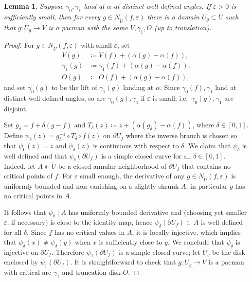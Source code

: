 \documentclass[]{amsart}
\newtheorem{lem}[thm]{Lemma}
\theoremstyle{remark}
\numberwithin{equation}{section}
\theoremstyle{definition}
\begin{document}
\begin{lem}
\label{lmm:PacmN}
Suppose $\gamma_0,\gamma_1$ land at $\alpha$ at distinct well-defined  angles. If $\varepsilon>0$ is sufficiently small, then for every $g\in N_{\widetilde U}(f, \varepsilon)$ there is a domain $U_g\subset \widetilde U$ such that $g:U_g \to V$ is a pacman with the same $V, \gamma_1 , O$ (up to translation). 
\end{lem}
\begin{proof}
For $g\in N_{\widetilde U}(f, \varepsilon)$ with small $\varepsilon$, set \[
\begin{array}{cc}
V(g)&\coloneqq V(f)+(\alpha(g)-\alpha(f)),\\ 
\gamma_1(g)&\coloneqq \gamma_1(f)+(\alpha(g)-\alpha(f)),\\
O(g)&\coloneqq O(f)+(\alpha(g)-\alpha(f)),
 \end{array}
\]  and set $\gamma_0(g)$ to be the lift of $\gamma_1(g)$ landing at $\alpha$. Since $\gamma_0(f),\gamma_1$ land at distinct well-defined  angles, so are $\gamma_0(g),\gamma_1$ if $\varepsilon$ is small; i.e.~$\gamma_0(g),\gamma_1$ are disjoint.

Set $g_\delta = f+\delta(g-f)$ and $T_\delta(z)\coloneqq z+(\alpha(g_\delta)-\alpha(f))$, where $\delta\in[0,1]$. Define $\psi_\delta(z)= g_\delta^{-1} \circ T_\delta \circ f(z)$ on $\partial U_f$ where the inverse branch is chosen so that $\psi_0(z)=z$ and $\psi_\delta(z)$ is continuous with respect to $\delta$. We claim that $\psi_\delta$ is well defined and that $\psi_\delta (\partial U_f)$ is a simple closed curve for all $\delta \in [0,1]$. Indeed, let $A \Subset \widetilde U$ be a closed annular neighborhood of $\partial U_f$ that contains no critical points of $f$. For $\varepsilon$ small enough, the derivative of any $g\in N_{\widetilde U}(f, \varepsilon)$ is uniformly bounded and non-vanishing on a slightly shrunk
 $A$; in particular $g$ has no critical points in $A$.  


It follows that 
$\psi_\delta\mid A$ has uniformly bounded derivative and (choosing yet smaller $\varepsilon$, if necessary) is close to the identity map,  hence $\psi_\delta(\partial U_f)\subset A$ is well-defined for all $\delta$. 
Since $f$ has no critical values in $A$, it is locally injective, which implies that $\psi_\delta (x)\neq \psi_\delta (y)$ when $x$ is sufficiently close to $y$. We conclude that $ \psi_\delta$ is injective on $\partial U_f$. Therefore $\psi_1(\partial U_f)$ is a simple closed curve; let $U_g$ be the disk enclosed by $\psi_1(\partial U_f)$.  It is straightforward to check that $g:U_g \to  V $ is a pacman with critical arc $\gamma_1$ and truncation disk $O$.
\end{proof}
\end{document}
